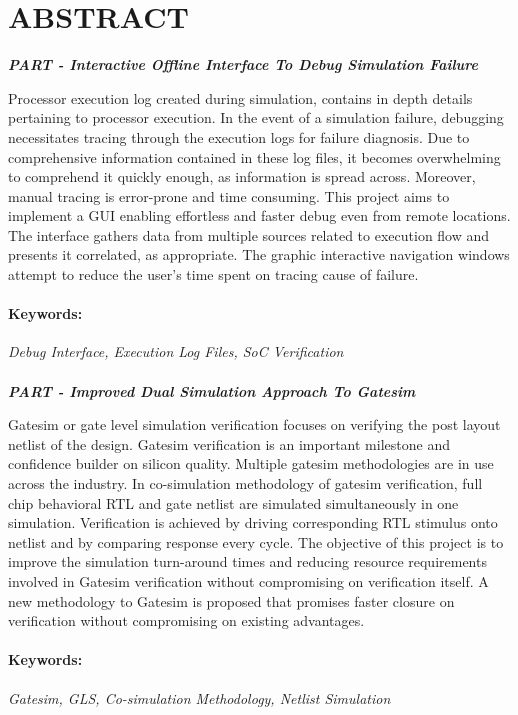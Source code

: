 \section*{\centering ABSTRACT}
\newcommand{\RNum}[1]{\uppercase\expandafter{\romannumeral #1\relax}}


\centerline{\emph{\bf PART \RNum{1}- Interactive Offline Interface To Debug Simulation Failure }}
\vspace{5pt}
Processor execution log created during simulation, contains in depth details pertaining to processor execution.  In the event of a simulation failure, debugging necessitates tracing through the execution logs for failure diagnosis.  Due to comprehensive information contained in these log files, it becomes overwhelming to comprehend it quickly enough, as information is spread across. Moreover, manual tracing is error-prone and time consuming.
This project aims to implement a GUI  enabling effortless and faster debug even from remote locations. The interface gathers data from multiple sources related to execution flow and presents it correlated, as appropriate. The graphic interactive navigation windows attempt to reduce the user's time spent on tracing cause of failure.



\paragraph{Keywords:}
 \emph{Debug Interface, Execution Log Files, SoC  Verification}


 \paragraph{}

\centerline{\emph{\bf PART \RNum{2}- Improved Dual Simulation Approach To Gatesim}}
\vspace{5pt}
Gatesim or gate level simulation verification focuses on verifying the post layout netlist of the design. Gatesim verification is an important milestone and confidence builder on silicon quality. Multiple gatesim methodologies are in use across the industry. In co-simulation methodology of gatesim verification, full chip behavioral RTL  and gate netlist are simulated simultaneously in one simulation. Verification is achieved by driving corresponding RTL stimulus onto netlist and by comparing response every cycle.
The objective of this project is to improve the simulation turn-around times and reducing resource requirements involved in Gatesim verification without compromising on verification itself. A new methodology to Gatesim is proposed that promises faster closure on verification without compromising on existing advantages.


\paragraph{Keywords:}
 \emph{Gatesim,  GLS,  Co-simulation Methodology, Netlist Simulation}




